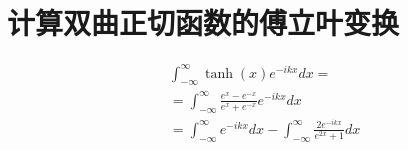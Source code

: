 \chapter{计算双曲正切函数的傅立叶变换}
\label{appendices a}

\begin{equation}
    \begin{aligned}
      &  \int_{-\infty }^{\infty } \tanh (x)e^{-ikx}dx= \\
&=\int_{-\infty}^{\infty} \frac{e^{x}-e^{-x}}{e^{x}+e^{-x}} e^{-i kx} d x \\
&=\int_{-\infty }^{\infty } e^{-ikx}dx-\int_{-\infty }^{\infty } \frac{2e^{-ikx}}{e^{2x}+1} dx \\
\end{aligned}
\end{equation}


